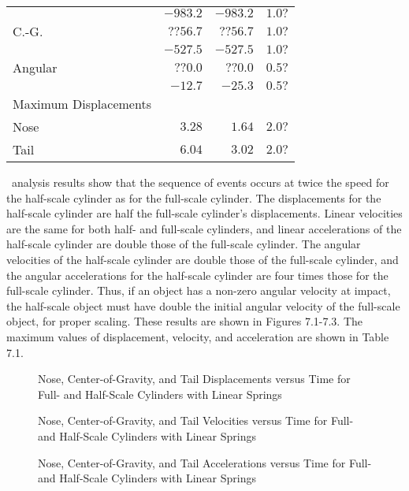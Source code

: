 \begin{table}
\begin{center}
\begin{tabular}{||l|r|r|r||}
                  &$-983.2$ &$-983.2$ &$1.0?$\\
\quad    C.-G.            &$??56.7$ &$??56.7$  &$1.0?$\\
                     &$-527.5$ &$-527.5$  &$1.0?$\\
\quad    Angular            &$??0.0$ &$??0.0$ &$0.5?$\\
                       &$-12.7$ &$-25.3$ &$0.5?$\\
Maximum Displacements & & & \\
\quad    Nose            &$3.28$ &$1.64$ &$2.0?$\\
\quad    Tail            &$6.04$ &$3.02$ &$2.0?$\\
\hline
\end{tabular}
\end{center}
\end{table}

     \SLAP\ analysis results show that the sequence of
events occurs at twice the speed for the half-scale cylinder
as for the
full-scale cylinder.  The displacements for the half-scale cylinder
are half the full-scale cylinder's
displacements.
Linear velocities are the same for
both half- and full-scale cylinders, and linear accelerations of the
half-scale cylinder are double those of the full-scale cylinder.
The angular
velocities of the half-scale cylinder are double those of the full-scale
cylinder, and the angular accelerations for
the half-scale cylinder are four times those
for the full-scale cylinder.
Thus, if an object has a non-zero angular velocity
at impact, the half-scale object must have
double the initial angular velocity of the full-scale object,
for proper scaling.  These
results are shown in Figures 7.1-7.3.  The maximum values of
displacement, velocity, and acceleration are shown in Table 7.1.

\begin{figure}
\vspace{3.5 in}
\caption{Nose, Center-of-Gravity, and Tail Displacements versus Time
for Full- and Half-Scale Cylinders with Linear Springs}
\end{figure}

\begin{figure}
\vspace{3.5 in}
\caption{Nose, Center-of-Gravity, and Tail Velocities versus Time
for Full- and Half-Scale Cylinders with Linear Springs}
\end{figure}

\begin{figure}
\vspace{3.5 in}
\caption{Nose, Center-of-Gravity, and Tail Accelerations versus Time
for Full- and Half-Scale Cylinders with Linear Springs}
\end{figure}

